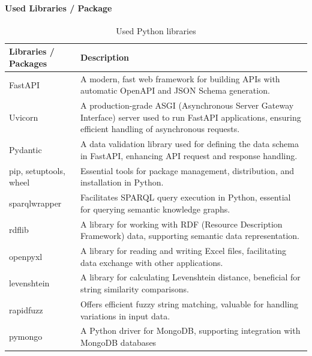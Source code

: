         \paragraph{Used Libraries / Package}
        \begin{table}[h]
            \centering
    	    {
    	    \begin{tabular}{ | m{2.5cm} | m{12cm} | }
                \hline
                \rowcolor{teal!30} Libraries / Packages & Description \\
                
                \hline
                FastAPI & A modern, fast web framework for building APIs with automatic OpenAPI and JSON Schema generation.\\

                \hline
                Uvicorn & A production-grade ASGI (Asynchronous Server Gateway Interface) server used to run FastAPI applications, ensuring efficient handling of asynchronous requests.\\

                \hline
                Pydantic & A data validation library used for defining the data schema in FastAPI, enhancing API request and response handling.\\

                \hline
                pip, setuptools, wheel & Essential tools for package management, distribution, and installation in Python.\\

                \hline
                sparqlwrapper & Facilitates SPARQL query execution in Python, essential for querying semantic knowledge graphs.\\

                \hline
                rdflib & A library for working with RDF (Resource Description Framework) data, supporting semantic data representation.\\

                \hline
                openpyxl & A library for reading and writing Excel files, facilitating data exchange with other applications.\\

                \hline
                levenshtein & A library for calculating Levenshtein distance, beneficial for string similarity comparisons.\\

                \hline
                rapidfuzz & Offers efficient fuzzy string matching, valuable for handling variations in input data.\\

                \hline
                pymongo & A Python driver for MongoDB, supporting integration with MongoDB databases\\
                
                \hline
            \end{tabular}}
            \caption{\label{tab:python-libs} Used Python libraries}
        \end{table}
    
